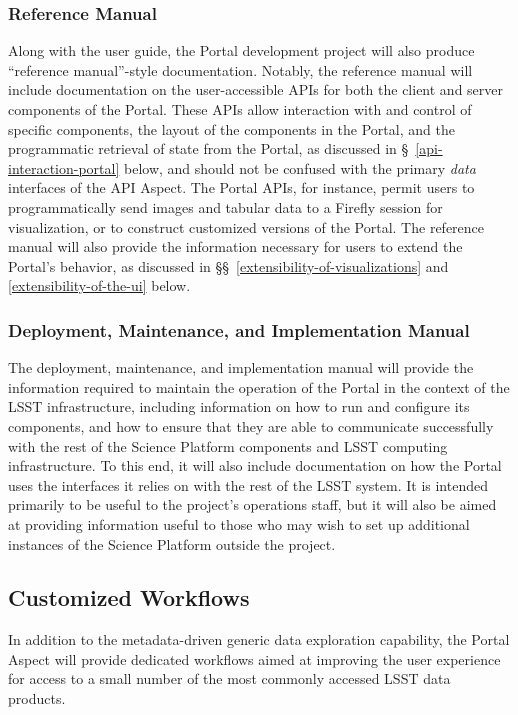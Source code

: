 \subsubsection{Reference Manual}

Along with the user guide, the Portal development project will also produce ``reference manual''-style documentation.
Notably, the reference manual will include documentation on the user-accessible APIs for both the client and server components of the Portal.
These APIs allow interaction with and control of specific components,
the layout of the components in the Portal,
and the programmatic retrieval of state from the Portal,
as discussed in \S~\ref{api-interaction-portal} below,
and should not be confused with the primary \emph{data} interfaces of the API Aspect.
The Portal APIs, for instance, permit users to programmatically send images and tabular data to a Firefly session for visualization,
or to construct customized versions of the Portal.
The reference manual will also provide the information necessary for users to extend the Portal's behavior,
as discussed in \S\S~\ref{extensibility-of-visualizations} and \ref{extensibility-of-the-ui} below.

\subsubsection{Deployment, Maintenance, and Implementation Manual}

The deployment, maintenance, and implementation manual will provide the information required to maintain the operation of the Portal in the context of the LSST infrastructure,
including information on how to run and configure its components,
and how to ensure that they are able to communicate successfully with the rest of the Science Platform components and LSST computing infrastructure.
To this end, it will also include documentation on how the Portal uses the interfaces it relies on with the rest of the LSST system.
It is intended primarily to be useful to the project's operations staff,
but it will also be aimed at providing information useful to those who may wish to set up additional instances of the Science Platform outside the project.

\subsection{Customized Workflows}\label{customized-workflows}

In addition to the metadata-driven generic data exploration capability, the Portal Aspect will provide dedicated workflows aimed at improving the user experience for access to a small number of the most commonly accessed LSST data products.

